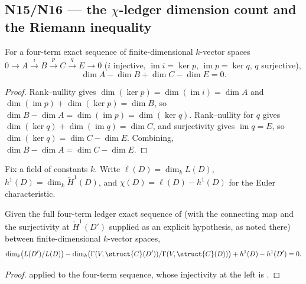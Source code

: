 \subsection{N15/N16 --- the \(\chi\)-ledger dimension count and the Riemann inequality}

\begin{lemma}
  \label{lem:adelic_finrank_alternating_exact4}
  \leanok
  For a four-term exact sequence of finite-dimensional \(k\)-vector
  spaces \(0 \to A \xrightarrow{i} B \xrightarrow{p} C \xrightarrow{q} E
  \to 0\) (\(i\) injective, \(\operatorname{im} i = \ker p\),
  \(\operatorname{im} p = \ker q\), \(q\) surjective),
  \[
    \dim A - \dim B + \dim C - \dim E = 0.
  \]
\end{lemma}
\begin{proof}
  \leanok
  Rank--nullity gives \(\dim(\ker p) = \dim(\operatorname{im} i) = \dim
  A\) and \(\dim(\operatorname{im} p) + \dim(\ker p) = \dim B\), so
  \(\dim B - \dim A = \dim(\operatorname{im} p) = \dim(\ker q)\).
  Rank--nullity for \(q\) gives \(\dim(\ker q) + \dim(\operatorname{im}
  q) = \dim C\), and surjectivity gives \(\operatorname{im} q = E\), so
  \(\dim(\ker q) = \dim C - \dim E\). Combining,
  \(\dim B - \dim A = \dim C - \dim E\).
\end{proof}

\begin{definition}
  \label{def:adelic_chi_ledger}
  \leanok
  Fix a field of constants \(k\). Write \(\ell(D) = \dim_k L(D)\),
  \(h^1(D) = \dim_k \check{H}^1(D)\), and \(\chi(D) = \ell(D) - h^1(D)\)
  for the Euler characteristic.
\end{definition}

\begin{theorem}
  \label{thm:adelic_ledger_alternating}
  \leanok
  Given the full four-term ledger exact sequence of
   (with the connecting map and
  the surjectivity at \(\check{H}^1(D')\) supplied as an explicit
  hypothesis, as noted there) between finite-dimensional \(k\)-vector
  spaces,
  \[
    \dim_k\bigl(L(D')/L(D)\bigr) - \dim_k\bigl(\Gamma(V,\struct{C}(D'))/
      \Gamma(V,\struct{C}(D))\bigr) + h^1(D) - h^1(D') = 0.
  \]
\end{theorem}
\begin{proof}
  \leanok
   applied to the four-term
  sequence, whose injectivity at the left is
  .
\end{proof}

